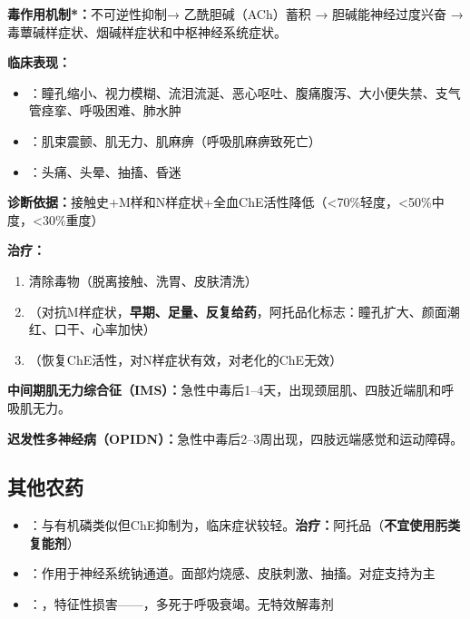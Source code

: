 \begin{keybox}
\textbf{毒作用机制*：}不可逆性抑制→ 乙酰胆碱（ACh）蓄积 → 胆碱能神经过度兴奋 → 毒蕈碱样症状、烟碱样症状和中枢神经系统症状。

\textbf{临床表现：}
\begin{itemize}[leftmargin=*]
    \item {}：瞳孔缩小、视力模糊、流泪流涎、恶心呕吐、腹痛腹泻、大小便失禁、支气管痉挛、呼吸困难、肺水肿
    \item {}：肌束震颤、肌无力、肌麻痹（呼吸肌麻痹致死亡）
    \item {}：头痛、头晕、抽搐、昏迷
\end{itemize}

\textbf{诊断依据：}接触史+M样和N样症状+全血ChE活性降低（<70\%轻度，<50\%中度，<30\%重度）

\textbf{治疗：}
\begin{enumerate}[leftmargin=*]
    \item 清除毒物（脱离接触、洗胃、皮肤清洗）
    \item {}（对抗M样症状，\textbf{早期、足量、反复给药}，阿托品化标志：瞳孔扩大、颜面潮红、口干、心率加快）
    \item {}（恢复ChE活性，对N样症状有效，对老化的ChE无效）
\end{enumerate}

\textbf{中间期肌无力综合征（IMS）：}急性中毒后1--4天，出现颈屈肌、四肢近端肌和呼吸肌无力。

\textbf{迟发性多神经病（OPIDN）：}急性中毒后2--3周出现，四肢远端感觉和运动障碍。
\end{keybox}

\subsection{其他农药}

\begin{itemize}[leftmargin=*]
    \item {}：与有机磷类似但ChE抑制为，临床症状较轻。\textbf{治疗：}阿托品（\textbf{不宜使用肟类复能剂}）
    \item {}：作用于神经系统钠通道。面部灼烧感、皮肤刺激、抽搐。对症支持为主
    \item {}：，特征性损害——，多死于呼吸衰竭。无特效解毒剂
\end{itemize}

